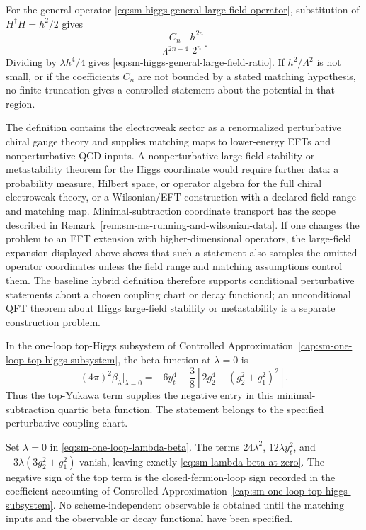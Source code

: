 For the general operator \eqref{eq:sm-higgs-general-large-field-operator},
substitution of \(H^\dagger H=h^2/2\) gives
\[
  \frac{C_n}{\Lambda^{2n-4}}\frac{h^{2n}}{2^n}.
\]
Dividing by \(\lambda h^4/4\) gives
\eqref{eq:sm-higgs-general-large-field-ratio}.  If \(h^2/\Lambda^2\) is not
small, or if the coefficients \(C_n\) are not bounded by a stated matching
hypothesis, no finite truncation gives a controlled statement about the
potential in that region.

\begin{remark}
\label{rem:sm-large-field-claims-hybrid-definition}
The definition contains the electroweak sector as a renormalized perturbative
chiral gauge theory and supplies matching maps to lower-energy EFTs and
nonperturbative QCD inputs.  A nonperturbative large-field stability or
metastability theorem for the Higgs coordinate would require further data:
a probability measure, Hilbert space, or operator algebra for the full chiral
electroweak theory, or a Wilsonian/EFT construction with a declared field
range and matching map.  Minimal-subtraction coordinate transport has the
scope described in Remark~\ref{rem:sm-ms-running-and-wilsonian-data}.  If one
changes the problem to an EFT extension with higher-dimensional operators,
the large-field expansion displayed above shows that such a statement also
samples the omitted operator coordinates unless the field range and matching
assumptions control them.  The baseline hybrid definition therefore supports
conditional perturbative statements about a chosen coupling chart or decay
functional; an unconditional QFT theorem about Higgs large-field stability or
metastability is a separate construction problem.
\end{remark}

\begin{remark}
\label{rem:sm-top-source-downward-quartic}
In the one-loop top-Higgs subsystem of
Controlled Approximation~\ref{cap:sm-one-loop-top-higgs-subsystem}, the beta
function at \(\lambda=0\) is
\begin{equation}
  (4\pi)^2\beta_\lambda\big|_{\lambda=0}
  =
  -6y_t^4
  +
  \frac{3}{8}\left[
    2g_2^4+(g_2^2+g_1^2)^2
  \right].
  \label{eq:sm-lambda-beta-at-zero}
\end{equation}
Thus the top-Yukawa term supplies the negative entry in this
minimal-subtraction quartic beta function.  The statement belongs to the
specified perturbative coupling chart.
\par

Set \(\lambda=0\) in \eqref{eq:sm-one-loop-lambda-beta}.  The terms
\(24\lambda^2\), \(12\lambda y_t^2\), and
\(-3\lambda(3g_2^2+g_1^2)\) vanish, leaving exactly
\eqref{eq:sm-lambda-beta-at-zero}.  The negative sign of the top term is the
closed-fermion-loop sign recorded in the coefficient accounting of
Controlled Approximation~\ref{cap:sm-one-loop-top-higgs-subsystem}.  No
scheme-independent observable is obtained until the matching inputs and the
observable or decay functional have been specified.
\end{remark}

